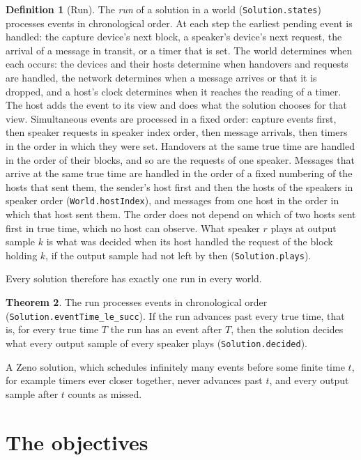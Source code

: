 \documentclass[11pt,a4paper]{article}
\newcommand{\lean}[1]{\texttt{#1}}
\theoremstyle{definition}
\newtheorem{definition}{Definition}[section]
\newtheorem{theorem}[definition]{Theorem}
\begin{document}
\begin{definition}[Run]
The \emph{run} of a solution in a world (\lean{Solution.states}) processes
events in chronological order. At each step the earliest pending event is
handled: the capture device's next block, a speaker's device's next
request, the arrival of a message in transit, or a timer that is set. The
world determines when each occurs: the devices and their hosts determine
when handovers and requests are handled, the network determines when a
message arrives or
that it is dropped, and a host's clock determines when it reaches the
reading of a timer. The host adds the event to its view and does what the
solution chooses for that view. Simultaneous events are processed in a
fixed order: capture events first, then speaker requests in speaker index
order, then message arrivals, then timers in the order in which they were
set. Handovers at the same true time are handled in the order of their
blocks, and so are the requests of one speaker.
Messages that arrive at the same true time are handled in the order of
a fixed numbering of the hosts that sent them, the sender's host first and
then the hosts of the speakers in speaker order (\lean{World.hostIndex}),
and messages from one host in the order in which that host sent them. The
order does not depend on which of two hosts sent first in true time, which
no host can observe. What speaker $r$ plays at output sample $k$ is what
was decided when its host handled the request of the block holding $k$, if
the output sample had not left by then (\lean{Solution.plays}).
\end{definition}

Every solution therefore has exactly one run in every world.

\begin{theorem}\label{thm:run}
The run processes events in chronological order
(\lean{Solution.eventTime\_le\_succ}). If the run advances past every true
time, that is, for every true time $T$ the run has an event after $T$, then
the solution decides what every output sample of every speaker plays
(\lean{Solution.decided}).
\end{theorem}

A Zeno solution, which schedules infinitely many events before some finite
time $t$, for example timers ever closer together, never advances past $t$,
and every output sample after $t$ counts as missed.

\section{The objectives}\label{sec:objectives}
\end{document}

